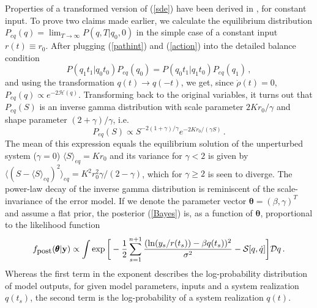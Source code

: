 \documentclass[11pt]{article}
\newcommand{\vc}[1]{{\bf #1 }}
\theoremstyle{definition}
\newcommand{\bt}{\pmb\theta}
\begin{document}
Properties of a transformed version of (\ref{sde}) have been derived in \cite{dutre_1977_SDE, schenzle_1979_multStochProc, fujisaka_1986_intermittency}, for constant input. 
To prove two claims made earlier, we calculate the equilibrium distribution $P_{eq}(q) = \lim_{T\rightarrow\infty} P(q,T|q_0,0)$ in the simple case of a constant input $r(t)\equiv r_{0}$. After plugging (\ref{pathint}) and (\ref{action}) into the detailed balance condition
\begin{equation}\label{detailed_balance}
P(q_1 t_1 | q_0 t_0 ) P_{eq}(q_0) = P(q_0 t_1 | q_1 t_0 ) P_{eq}(q_1) \,,
\end{equation}
and using the transformation $q(t) \rightarrow q(-t)$, we get, since $\dot\rho(t)= 0$,
$P_{eq}(q)
  \propto
  e^{-2\mathcal{H}(q)}$.
Transforming back to the original variables, it turns out that $P_{eq}(S)$ is an inverse gamma distribution with scale parameter $2Kr_{0}/\gamma$ and shape parameter $(2+\gamma)/\gamma$, i.e.
\begin{equation}\label{inverse_gamma}
  P_{eq}(S)
  \propto
  S^{-2(1+\gamma)/\gamma}e^{-2Kr_{0}/(\gamma S)}\,.
\end{equation}
The mean of this expression equals the equilibrium solution of the unperturbed system ($\gamma=0$)
$\langle S\rangle_{eq}=Kr_{0}$
and its variance for $\gamma< 2$ is given by $ \langle (S - \langle S\rangle_{eq})^2\rangle_{eq}
  =
  K^2r_{0}^2
  \gamma/(2-\gamma)$, which for $\gamma\geq 2$ is seen to diverge.
The power-law decay of the inverse gamma distribution is reminiscent of the scale-invariance of the error model. If we denote the parameter vector $\bt=(\beta,\gamma)^T$ and assume a flat prior, the posterior (\ref{Bayes}) is, as a function of $\bt$, proportional to the likelihood function 
\begin{equation}\label{posterior_pathint}
  f_{\mbox{\small post}}(\bt | \vc y)
  \propto
  \int
  \exp\bigg[
    -\frac{1}{2}
    \sum_{s=1}^{n+1}
    \frac
    {(\ln(y_s/r(t_s))-{\beta q(t_s)})^2}
    {\sigma^2} -{{\mathcal S}}[{q},\dot q]
  \bigg]
  {\mathcal Dq}
  \,.
\end{equation}
Whereas the first term in the exponent describes the log-probability distribution of model outputs, for given model parameters, inputs and a system realization $q(t_s)$, the second term is the log-probability of a system realization $q(t)$. 

\end{document}
